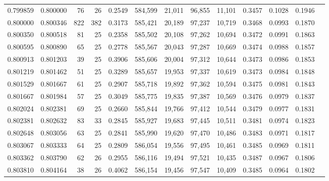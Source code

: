 \begin{tabular}{rrrrrrrrrrrrr}
0.799859 & 0.800000 &     76 &    26 &                                     0.2549 & 584,599 &  21,011 &  96,855 &  11,101 & 0.3457 & 0.1028 & 0.1946 \\
0.800000 & 0.800346 &    822 &   382 &                                     0.3173 & 585,421 &  20,189 &  97,237 &  10,719 & 0.3468 & 0.0993 & 0.1870 \\
0.800350 & 0.800518 &     81 &    25 &                                     0.2358 & 585,502 &  20,108 &  97,262 &  10,694 & 0.3472 & 0.0991 & 0.1863 \\
0.800595 & 0.800890 &     65 &    25 &                                     0.2778 & 585,567 &  20,043 &  97,287 &  10,669 & 0.3474 & 0.0988 & 0.1857 \\
0.800913 & 0.801203 &     39 &    25 &                                     0.3906 & 585,606 &  20,004 &  97,312 &  10,644 & 0.3473 & 0.0986 & 0.1853 \\
0.801219 & 0.801462 &     51 &    25 &                                     0.3289 & 585,657 &  19,953 &  97,337 &  10,619 & 0.3473 & 0.0984 & 0.1848 \\
0.801529 & 0.801667 &     61 &    25 &                                     0.2907 & 585,718 &  19,892 &  97,362 &  10,594 & 0.3475 & 0.0981 & 0.1843 \\
0.801667 & 0.801984 &     57 &    25 &                                     0.3049 & 585,775 &  19,835 &  97,387 &  10,569 & 0.3476 & 0.0979 & 0.1837 \\
0.802024 & 0.802381 &     69 &    25 &                                     0.2660 & 585,844 &  19,766 &  97,412 &  10,544 & 0.3479 & 0.0977 & 0.1831 \\
0.802381 & 0.802632 &     83 &    33 &                                     0.2845 & 585,927 &  19,683 &  97,445 &  10,511 & 0.3481 & 0.0974 & 0.1823 \\
0.802648 & 0.803056 &     63 &    25 &                                     0.2841 & 585,990 &  19,620 &  97,470 &  10,486 & 0.3483 & 0.0971 & 0.1817 \\
0.803067 & 0.803333 &     64 &    25 &                                     0.2809 & 586,054 &  19,556 &  97,495 &  10,461 & 0.3485 & 0.0969 & 0.1811 \\
0.803362 & 0.803790 &     62 &    26 &                                     0.2955 & 586,116 &  19,494 &  97,521 &  10,435 & 0.3487 & 0.0967 & 0.1806 \\
0.803810 & 0.804164 &     38 &    26 &                                     0.4062 & 586,154 &  19,456 &  97,547 &  10,409 & 0.3485 & 0.0964 & 0.1802 \\

\end{tabular}

